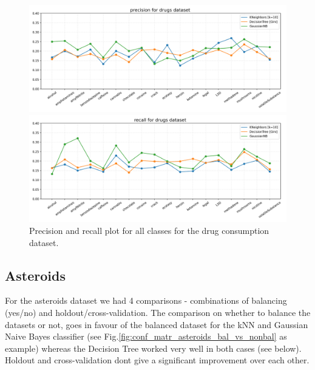 \documentclass{article}
\begin{document}
\begin{figure}[H]
	\centering
	\begin{minipage}[b]{0.8\textwidth}
		\includegraphics[width=1.1\textwidth]{Plots/precision_comparison_drugs.png}
	\end{minipage}
	\begin{minipage}[b]{0.8\textwidth}
		\includegraphics[width=1.1\textwidth]{Plots/recall_comparison_drugs.png}
	\end{minipage}
	\caption{Precision and recall plot for all classes for the drug consumption dataset.}
	\label{fig:drugs_comparison}
\end{figure}








\subsection{Asteroids}

For the asteroids dataset we had 4 comparisons - combinations of balancing (yes/no) and holdout/cross-validation. The comparison on whether to balance the datasets or not, goes in favour of the balanced dataset for the kNN and Gaussian Naive Bayes classifier (see Fig.\ref{fig:conf_matr_asteroids_bal_vs_nonbal} as example) whereas the Decision Tree worked very well in both cases (see below). Holdout and cross-validation dont give a significant improvement over each other. \\
\end{document}

